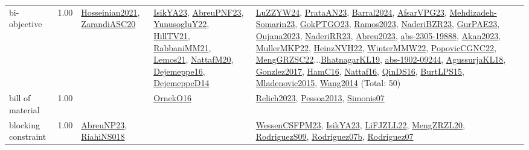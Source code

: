 {\begin{longtable}{p{3cm}r>{\raggedright\arraybackslash}p{6cm}>{\raggedright\arraybackslash}p{6cm}>{\raggedright\arraybackslash}p{8cm}}
\index{bi-objective}\index{Concepts!bi-objective}bi-objective &  1.00 & \hyperref[detail:Hosseinian2021]{Hosseinian2021}, \hyperref[detail:ZarandiASC20]{ZarandiASC20} & \hyperref[detail:IsikYA23]{IsikYA23}, \hyperref[detail:AbreuPNF23]{AbreuPNF23}, \hyperref[detail:YunusogluY22]{YunusogluY22}, \hyperref[detail:HillTV21]{HillTV21}, \hyperref[detail:RabbaniMM21]{RabbaniMM21}, \hyperref[detail:Lemos21]{Lemos21}, \hyperref[detail:NattafM20]{NattafM20}, \hyperref[detail:Dejemeppe16]{Dejemeppe16}, \hyperref[detail:DejemeppeD14]{DejemeppeD14} & \hyperref[detail:LuZZYW24]{LuZZYW24}, \hyperref[detail:PrataAN23]{PrataAN23}, \hyperref[detail:Barral2024]{Barral2024}, \hyperref[detail:AfsarVPG23]{AfsarVPG23}, \hyperref[detail:Mehdizadeh-Somarin23]{Mehdizadeh-Somarin23}, \hyperref[detail:GokPTGO23]{GokPTGO23}, \hyperref[detail:Ramos2023]{Ramos2023}, \hyperref[detail:NaderiBZR23]{NaderiBZR23}, \hyperref[detail:GurPAE23]{GurPAE23}, \hyperref[detail:Oujana2023]{Oujana2023}, \hyperref[detail:NaderiRR23]{NaderiRR23}, \hyperref[detail:Abreu2023]{Abreu2023}, \hyperref[detail:abs-2305-19888]{abs-2305-19888}, \hyperref[detail:Akan2023]{Akan2023}, \hyperref[detail:MullerMKP22]{MullerMKP22}, \hyperref[detail:HeinzNVH22]{HeinzNVH22}, \hyperref[detail:WinterMMW22]{WinterMMW22}, \hyperref[detail:PopovicCGNC22]{PopovicCGNC22}, \hyperref[detail:MengGRZSC22]{MengGRZSC22}...\hyperref[detail:BhatnagarKL19]{BhatnagarKL19}, \hyperref[detail:abs-1902-09244]{abs-1902-09244}, \hyperref[detail:AgussurjaKL18]{AgussurjaKL18}, \hyperref[detail:Gonzlez2017]{Gonzlez2017}, \hyperref[detail:HamC16]{HamC16}, \hyperref[detail:Nattaf16]{Nattaf16}, \hyperref[detail:QinDS16]{QinDS16}, \hyperref[detail:BurtLPS15]{BurtLPS15}, \hyperref[detail:Mladenovic2015]{Mladenovic2015}, \hyperref[detail:Wang2014]{Wang2014} (Total: 50)\\
\index{bill of material}\index{Concepts!bill of material}bill of material &  1.00 &  & \hyperref[detail:OrnekO16]{OrnekO16} & \hyperref[detail:Relich2023]{Relich2023}, \hyperref[detail:Pessoa2013]{Pessoa2013}, \hyperref[detail:Simonis07]{Simonis07}\\
\index{blocking constraint}\index{Concepts!blocking constraint}blocking constraint &  1.00 & \hyperref[detail:AbreuNP23]{AbreuNP23}, \hyperref[detail:RiahiNS018]{RiahiNS018} &  & \hyperref[detail:WessenCSFPM23]{WessenCSFPM23}, \hyperref[detail:IsikYA23]{IsikYA23}, \hyperref[detail:LiFJZLL22]{LiFJZLL22}, \hyperref[detail:MengZRZL20]{MengZRZL20}, \hyperref[detail:RodriguezS09]{RodriguezS09}, \hyperref[detail:Rodriguez07b]{Rodriguez07b}, \hyperref[detail:Rodriguez07]{Rodriguez07}\\

\end{longtable}}

